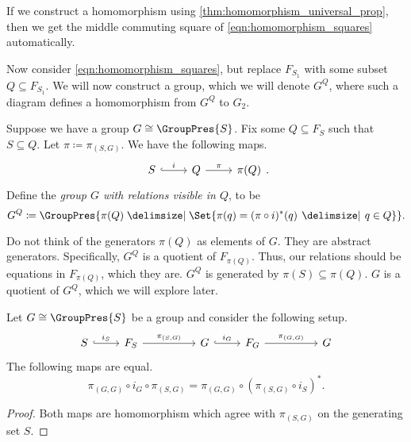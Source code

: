 \begin{remark}
	If we construct a homomorphism using \cref{thm:homomorphism_universal_prop}, then we get the middle commuting square of \eqref{eqn:homomorphism_squares} automatically.
	\label{rmk:universal_prop_homomorphism_gives_squares}
\end{remark}

Now consider \eqref{eqn:homomorphism_squares}, but replace $F_{S_1}$ with some subset $Q \subseteq F_{S_1}$.
We will now construct a group, which we will denote $G^Q$, where such a diagram defines a homomorphism from $G^Q$ to $G_2$.

\begin{definition}
	Suppose we have a group $G \cong \GroupPres{S}$.
	Fix some $Q \subseteq F_S$ such that $S \subseteq Q$.
	Let $\pi \coloneq \pi_{(S,G)}$.
	We have the following maps.
	\[
		\begin{tikzcd}
			S \ar[r, hook, "i"] & Q \ar[r, "\pi"] & \pi(Q)
		\end{tikzcd}
		.\]
	Define the \emph{group $G$ with relations visible in $Q$}, to be
	\[
		G^Q \coloneqq \GroupPres{\pi(Q) \relations \Set{\pi(q) = (\pi \circ i)^*(q) \given q \in Q} }
		.\]
	\label{def:G_Q}
\end{definition}

Do not think of  the generators $\pi(Q)$ as elements of $G$.
They are abstract generators.
Specifically,  $G^Q$ is a quotient of  $F_{\pi(Q)}$.
Thus, our relations should be equations in $F_{\pi(Q)}$, which they are.
$G^Q$ is generated by $\pi(S) \subseteq \pi(Q)$.
$G$ is a quotient of  $G^Q$, which we will explore later.

\begin{lemma}
	Let $G \cong \GroupPres{S}$ be a group and consider the following setup.
	\[
		\begin{tikzcd}
			S \ar[r, hook, "i_S"] & F_S \ar[rr, "\pi_{(S,G)}"] & & G \ar[r, hook, "i_G"] & F_G \ar[rr, "\pi_{(G,G)}"] & & G
		\end{tikzcd}
	\]
	The following maps are equal.
	\[
		\pi_{(G,G)} \circ i_G \circ \pi_{(S,G)} = \pi_{(G,G)} \circ (\pi_{(S,G)} \circ i_S)^*
		.\]
	\label{lem:group_projections}
\end{lemma}

\begin{proof}
	Both maps are homomorphism which agree with $\pi_{\left( S,G\right)}$ on the generating set $S$.
\end{proof}

